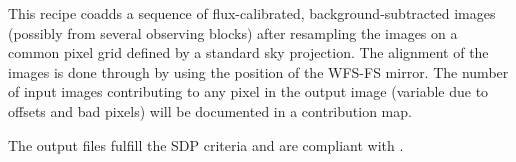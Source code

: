 This recipe coadds a sequence of flux-calibrated,
background-subtracted images (possibly from several observing blocks)
after resampling the images on a common pixel grid defined by a
standard sky projection.
The alignment of the images is done through by using the position of the \ac{WFS-FS} mirror.
The number of input
images contributing to any pixel in the output image (variable due to
offsets and bad pixels) will be documented in a contribution
map.

The output files fulfill the \ac{SDP} criteria and are compliant with .

